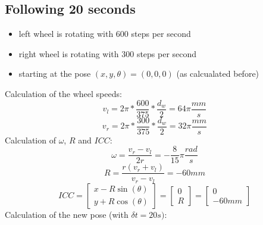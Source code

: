 \documentclass[paper=a4, fontsize=11pt]{scrartcl} %
\begin{document}

\subsection{Following 20 seconds}

\begin{itemize}
    \item left wheel is rotating with 600 steps per second
    \item right wheel is rotating with 300 steps per second
    \item starting at the pose $ (x, y, \theta) = (0, 0, 0) $ (as calcualated
        before)
\end{itemize}

Calculation of the wheel speeds:
\begin{equation}
    v_l = 2\pi * \frac{600}{375} * \frac{d_w}{2} = 64\pi \frac{mm}{s}
\end{equation}
\begin{equation}
    v_r = 2\pi * \frac{300}{375} * \frac{d_w}{2} = 32\pi \frac{mm}{s}
\end{equation}
Calculation of $ \omega $, $ R $ and $ ICC $:
\begin{equation}
    \omega = \frac{v_r - v_l}{2r} = -\frac{8}{15}\pi \frac{rad}{s}
\end{equation}
\begin{equation}
    R = \frac{r(v_r + v_l)}{v_r - v_l} = -60 mm
\end{equation}
\begin{equation}
    ICC = \begin{bmatrix}
        x - R\sin(\theta)\\
        y + R\cos(\theta)
    \end{bmatrix} = \begin{bmatrix}
        0\\
        R
    \end{bmatrix} = \begin{bmatrix}
        0\\
        -60 mm
    \end{bmatrix}
\end{equation}
Calculation of the new pose (with $ \delta t = 20 s) $:
\end{document}
